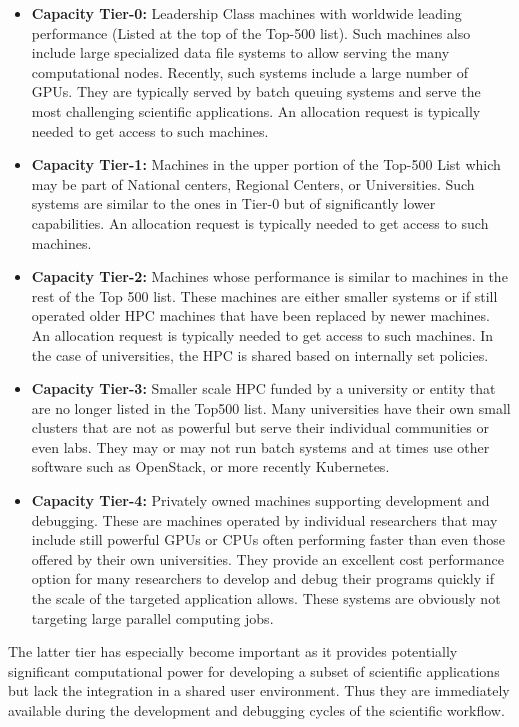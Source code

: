 \documentclass[utf8]{FrontiersinVancouver} %
\begin{document}
\begin{itemize}
\item {\bf Capacity Tier-0:} Leadership Class machines with worldwide leading
  performance (Listed at the top of the Top-500 list). Such machines also include large specialized data file systems to allow serving the many computational nodes. Recently, such systems include a large number of GPUs. They are typically served by batch queuing systems and serve the most challenging scientific applications. An allocation request is typically needed to get access to such machines.
\item {\bf Capacity Tier-1:} Machines in the upper portion of the Top-500 List which may be part of   National centers, Regional Centers, or Universities. Such systems are similar to the ones in Tier-0 but of significantly lower capabilities.
An allocation request is typically needed to get access to such machines.
\item {\bf Capacity Tier-2:} Machines whose performance is similar to machines
  in the rest of the Top 500 list. These machines are either smaller systems or if still operated older HPC machines that have been replaced by newer machines.
  An allocation request is typically needed to get access to such machines. In the case of universities, the HPC is shared based on internally set policies.
\item {\bf Capacity Tier-3:} Smaller scale HPC funded by a university or entity
  that are no longer listed in the Top500 list. Many universities have their own small clusters that are not as powerful but serve their individual communities or even labs. They may or may not run batch systems and at times use other software such as OpenStack, or more recently Kubernetes. 
\item {\bf Capacity Tier-4:} Privately owned machines supporting development
  and debugging. These are machines operated by individual researchers that may include still powerful GPUs or CPUs often performing faster than even those offered by their own universities. They provide an excellent cost performance option for many researchers to develop and debug their programs quickly if the scale of the targeted application allows. These systems are obviously not targeting large parallel computing jobs.
  
\end{itemize}

The latter tier has especially become important as it provides potentially significant computational power for developing a subset of scientific applications but lack the integration in a shared user environment. Thus they are immediately available during the development and debugging cycles of the scientific workflow.
\end{document}
